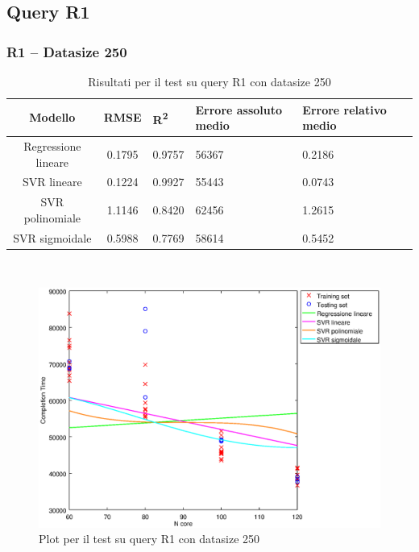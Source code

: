 \documentclass[a4paper,11pt]{article}
\begin{document}
\subsection{Query R1}

\subsubsection{R1 -- Datasize 250}
\begin{table}[bhpt]
	\centering
	\begin{adjustbox}{center}
		\begin{tabular}{c | c M{1.2cm} M{2.5cm} M{2.5cm} M{1.8cm}}
			Modello & RMSE & R\textsuperscript{2} & Errore assoluto medio & Errore relativo medio \tabularnewline
			\hline
			Regressione lineare & 0.1795 & 0.9757 &  56367 & 0.2186 \\
			SVR lineare & 0.1224 & 0.9927 &  55443 & 0.0743 \\
			SVR polinomiale & 1.1146 & 0.8420 &  62456 & 1.2615 \\
			SVR sigmoidale & 0.5988 & 0.7769 &  58614 & 0.5452 \\
		\end{tabular}
	\end{adjustbox}
	\\
	\caption{Risultati per il test su query R1 con datasize 250}
	\label{table_R1_250}
\end{table}

\begin {figure}[hbtp]
\centering
\includegraphics[width=\textwidth]{output/R1_250/plot_R1_250.eps}
\caption {Plot per il test su query R1 con datasize 250}
\end {figure}
\end{document}
